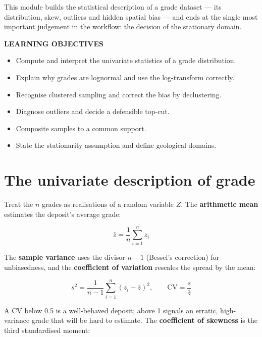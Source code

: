 \documentclass[11pt]{article}
\begin{document}

This module builds the statistical description of a grade dataset --- its
distribution, skew, outliers and hidden spatial bias --- and ends at the
single most important judgement in the workflow: the decision of the
stationary domain.

\begin{objbox}
{\sffamily\bfseries\color{bronze}LEARNING OBJECTIVES}
\begin{itemize}[leftmargin=14pt,itemsep=2pt]
\item Compute and interpret the univariate statistics of a grade
distribution.
\item Explain why grades are lognormal and use the log-transform
correctly.
\item Recognise clustered sampling and correct the bias by declustering.
\item Diagnose outliers and decide a defensible top-cut.
\item Composite samples to a common support.
\item State the stationarity assumption and define geological domains.
\end{itemize}
\end{objbox}

\section{The univariate description of grade}

Treat the $n$ grades as realisations of a random variable $Z$. The
\textbf{arithmetic mean} estimates the deposit's average grade:

\begin{eqbox}
\[ \bar{z} = \frac{1}{n}\sum_{i=1}^{n} z_i \tag{3.1}\]
\end{eqbox}

The \textbf{sample variance} uses the divisor $n-1$ (Bessel's
correction) for unbiasedness, and the \textbf{coefficient of variation}
rescales the spread by the mean:

\begin{eqbox}
\[ s^2 = \frac{1}{n-1}\sum_{i=1}^{n}(z_i-\bar{z})^2,
   \qquad \mathrm{CV} = \frac{s}{\bar{z}} \tag{3.2--3.3}\]
\end{eqbox}

A CV below 0.5 is a well-behaved deposit; above 1 signals an erratic,
high-variance grade that will be hard to estimate. The \textbf{coefficient
of skewness} is the third standardised moment:
\end{document}
